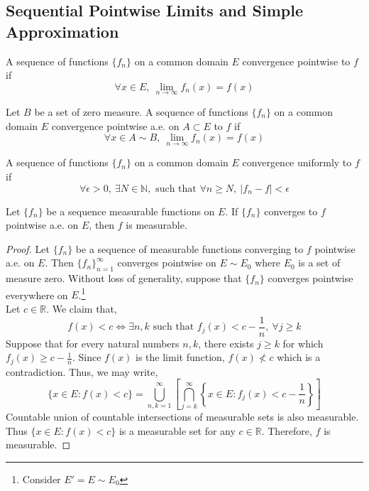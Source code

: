 \subsection{Sequential Pointwise Limits and Simple Approximation}
\begin{definition}
	A sequence of functions $\{f_n\}$ on a common domain $E$ convergence pointwise to $f$ if 
	$$\forall x \in E,\ \lim_{n \to \infty} f_n(x) = f(x)$$
\end{definition}
\begin{definition}
	Let $B$ be a set of zero measure.
	A sequence of functions $\{f_n\}$ on a common domain $E$ convergence pointwise a.e. on $A \subset E$ to $f$ if 
	$$\forall x \in A \sim B,\ \lim_{n \to \infty} f_n(x) = f(x)$$
\end{definition}
\begin{definition}
	A sequence of functions $\{f_n\}$ on a common domain $E$ convergence uniformly to $f$ if 
	$$\forall \epsilon > 0,\ \exists N \in \mathbb{N},\text{ such that } \forall n \ge N,\ |f_n-f| < \epsilon $$
\end{definition}

\begin{theorem}
	Let $\{ f_n \}$ be a sequence measurable functions on $E$.
	If $\{ f_n \}$ converges to $f$ pointwise a.e. on $E$, then $f$ is measurable.
\end{theorem}
\begin{proof}
	Let $\{ f_n \}$ be a sequence of measurable functions converging to $f$ pointwise a.e. on $E$.
	Then $\{ f_n\}_{n = 1}^\infty$	converges pointwise on $E \sim E_0$ where $E_0$ is a set of measure zero.
	Without loss of generality, suppose that $\{ f_n \}$ converges pointwise everywhere on $E$.\dag\footnote{
		Consider $E' = E \sim E_0$}\\

	Let $c \in \mathbb{R}$.
	We claim that,
	\begin{equation}
		f(x) < c \iff \exists n,k \text{ such that } f_j(x) < c-\frac{1}{n},\ \forall j \ge k
	\end{equation}
	Suppose that for every natural numbers $n,k$, there exists $j \ge k$ for which $f_j(x) \ge c - \frac{1}{n}$.
	Since $f(x)$ is the limit function, $f(x) \not< c$ which is a contradiction. 
	Thus, we may write,
	\begin{equation}
		\{ x \in E : f(x) < c \} = \bigcup_{n,k = 1}^\infty \left[ \bigcap_{j=k}^\infty \left\{ x \in E : f_j(x) < c-\frac{1}{n} \right\} \right] 
	\end{equation}
	Countable union of countable intersections of measurable sets is also measurable.
	Thus $\{ x \in E : f(x) < c \}$ is a measurable set for any $c \in \mathbb{R}$.
	Therefore, $f$ is measurable.
\end{proof}

